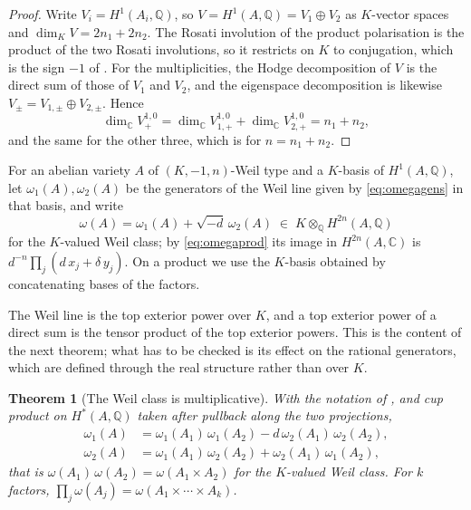 \documentclass[11pt,reqno]{amsart}
\theoremstyle{plain}
\newtheorem{theorem}{Theorem}[section]
\theoremstyle{definition}
\theoremstyle{remark}
\newcommand{\QQ}{\mathbb{Q}}
\newcommand{\CC}{\mathbb{C}}
\begin{document}
\begin{proof}
Write $V_{i}=H^{1}(A_{i},\QQ)$, so $V=H^{1}(A,\QQ)=V_{1}\oplus V_{2}$ as
$K$-vector spaces and $\dim_{K}V=2n_{1}+2n_{2}$. The Rosati involution of the
product polarisation is the product of the two Rosati involutions, so it
restricts on $K$ to conjugation, which is the sign $-1$ of
. For the multiplicities, the Hodge decomposition of $V$ is
the direct sum of those of $V_{1}$ and $V_{2}$, and the eigenspace
decomposition is likewise $V_{\pm}=V_{1,\pm}\oplus V_{2,\pm}$. Hence
\[
  \dim_{\CC}V_{+}^{1,0}
  =\dim_{\CC}V_{1,+}^{1,0}+\dim_{\CC}V_{2,+}^{1,0}
  =n_{1}+n_{2},
\]
and the same for the other three, which is  for
$n=n_{1}+n_{2}$.
\end{proof}

For an abelian variety $A$ of $(K,-1,n)$-Weil type and a $K$-basis of
$H^{1}(A,\QQ)$, let $\omega_{1}(A),\omega_{2}(A)$ be the generators of the
Weil line given by \eqref{eq:omegagens} in that basis, and write
\[
  \omega(A)=\omega_{1}(A)+\sqrt{-d}\,\omega_{2}(A)\;\in\;
  K\otimes_{\QQ}H^{2n}(A,\QQ)
\]
for the $K$-valued Weil class; by \eqref{eq:omegaprod} its image in
$H^{2n}(A,\CC)$ is $d^{-n}\prod_{j}(d\,x_{j}+\delta\,y_{j})$. On a product we
use the $K$-basis obtained by concatenating bases of the factors.

The Weil line is the top exterior power over $K$, and a top exterior power of
a direct sum is the tensor product of the top exterior powers. This is the
content of the next theorem; what has to be checked is its effect on the
rational generators, which are defined through the real structure rather
than over $K$.

\begin{theorem}[The Weil class is multiplicative]\label{thm:weilmult}
With the notation of , and cup product on
$H^{*}(A,\QQ)$ taken after pullback along the two projections,
\begin{equation}\label{eq:weilmult}
\begin{aligned}
  \omega_{1}(A)&=\omega_{1}(A_{1})\,\omega_{1}(A_{2})
    -d\,\omega_{2}(A_{1})\,\omega_{2}(A_{2}),\\
  \omega_{2}(A)&=\omega_{1}(A_{1})\,\omega_{2}(A_{2})
    +\omega_{2}(A_{1})\,\omega_{1}(A_{2}),
\end{aligned}
\end{equation}
that is $\omega(A_{1})\,\omega(A_{2})=\omega(A_{1}\times A_{2})$ for the
$K$-valued Weil class. For $k$ factors,
$\prod_{j}\omega(A_{j})=\omega(A_{1}\times\cdots\times A_{k})$.
\end{theorem}
\end{document}
